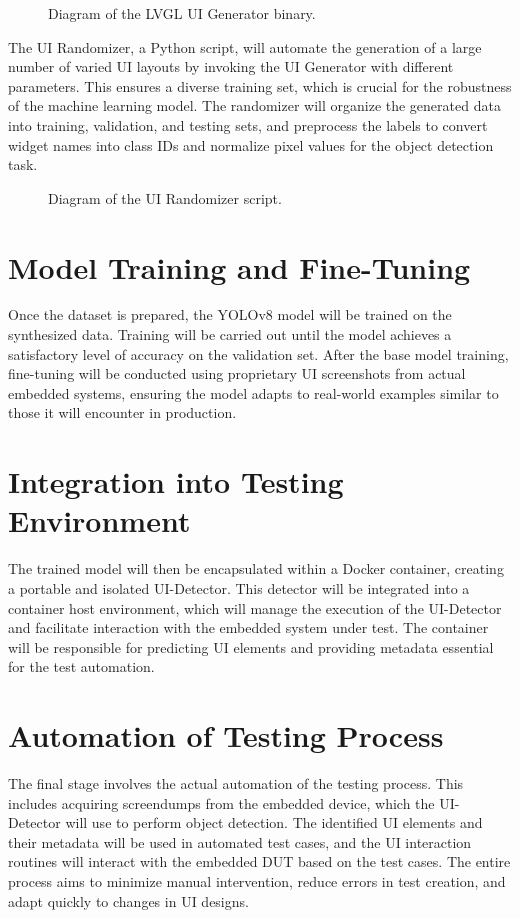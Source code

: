 \documentclass[Proposal,BIC,english,IEEE]{BASE/twbook} %
\begin{document}
\begin{figure}[!htbp]
    \centering
    
    \caption{Diagram of the LVGL UI Generator binary.}\label{Fig2}
\end{figure}
\newpage
The UI Randomizer, a Python script, will automate the generation of a large number of varied UI layouts by invoking the UI Generator with different parameters. This ensures a diverse training set, which is crucial for the robustness of the machine learning model. The randomizer will organize the generated data into training, validation, and testing sets, and preprocess the labels to convert widget names into class IDs and normalize pixel values for the object detection task.

\begin{figure}[!htbp]
    \centering
    
    \caption{Diagram of the UI Randomizer script.}\label{Fig3}
\end{figure}


\section{Model Training and Fine-Tuning}
Once the dataset is prepared, the YOLOv8 model will be trained on the synthesized data. Training will be carried out until the model achieves a satisfactory level of accuracy on the validation set. After the base model training, fine-tuning will be conducted using proprietary UI screenshots from actual embedded systems, ensuring the model adapts to real-world examples similar to those it will encounter in production.

\section{Integration into Testing Environment}
The trained model will then be encapsulated within a Docker container, creating a portable and isolated UI-Detector. This detector will be integrated into a container host environment, which will manage the execution of the UI-Detector and facilitate interaction with the embedded system under test. The container will be responsible for predicting UI elements and providing metadata essential for the test automation.

\section{Automation of Testing Process}
The final stage involves the actual automation of the testing process. This includes acquiring screendumps from the embedded device, which the UI-Detector will use to perform object detection. The identified UI elements and their metadata will be used in automated test cases, and the UI interaction routines will interact with the embedded DUT based on the test cases. The entire process aims to minimize manual intervention, reduce errors in test creation, and adapt quickly to changes in UI designs.
\end{document}
